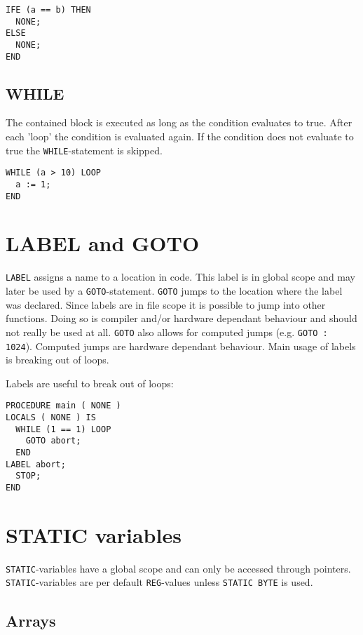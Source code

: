 \begin{verbatim}
IFE (a == b) THEN
  NONE;
ELSE
  NONE;
END
\end{verbatim}

\subsection{WHILE}

The contained block is executed as long as the condition evaluates to true. After each 'loop' the condition is evaluated again. If the condition does not evaluate
to true the \verb|WHILE|-statement is skipped. 

\begin{verbatim}
WHILE (a > 10) LOOP
  a := 1;
END
\end{verbatim}

\section{LABEL and GOTO}

\verb|LABEL| assigns a name to a location in code. This label is in global scope and may later be used by a \verb|GOTO|-statement. \verb|GOTO| jumps to the location
where the label was declared. Since labels are in file scope it is possible to jump into other functions. Doing so is compiler and/or hardware dependant behaviour
and should not really be used at all. \verb|GOTO| also allows for computed jumps (e.g. \verb|GOTO : 1024|). Computed jumps are hardware dependant behaviour. Main
usage of labels is breaking out of loops.

Labels are useful to break out of loops:

\begin{verbatim}
PROCEDURE main ( NONE )
LOCALS ( NONE ) IS
  WHILE (1 == 1) LOOP
    GOTO abort;
  END
LABEL abort;
  STOP;
END
\end{verbatim}

\section{STATIC variables}

\verb|STATIC|-variables have a global scope and can only be accessed through pointers. \verb|STATIC|-variables are per default \verb|REG|-values unless 
\verb|STATIC BYTE| is used. 

\subsection{Arrays}


